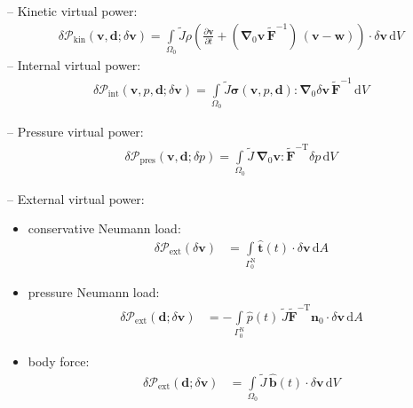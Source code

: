 \documentclass[a4paper,12pt]{report}
\newcommand{\bs}[1]{\boldsymbol{#1}}
\newcommand{\Om}{\mathit{\Omega}}
\newcommand{\Gm}{\mathit{\Gamma}}
\begin{document}
-- Kinetic virtual power:
\begin{equation}
\begin{aligned}
\delta \mathcal{P}_{\mathrm{kin}}(\bs{v},\bs{d};\delta\bs{v}) = \int\limits_{\Om_0} \widetilde{J} \rho\left(\frac{\partial\bs{v}}{\partial t} + (\bs{\nabla}_{0}\bs{v}\,\widetilde{\bs{F}}^{-1})\,(\bs{v}-\bs{w})\right) \cdot \delta\bs{v} \,\mathrm{d}V
\end{aligned}
\end{equation}
-- Internal virtual power:
\begin{equation}
\begin{aligned}
\delta \mathcal{P}_{\mathrm{int}}(\bs{v},p,\bs{d};\delta\bs{v}) = 
\int\limits_{\Om_0} \widetilde{J}\bs{\sigma}(\bs{v},p,\bs{d}) : \bs{\nabla}_{0} \delta\bs{v}\,\widetilde{\bs{F}}^{-1} \,\mathrm{d}V
\end{aligned}
\end{equation}

-- Pressure virtual power:
\begin{equation}
\begin{aligned}
\delta \mathcal{P}_{\mathrm{pres}}(\bs{v},\bs{d};\delta p) = 
\int\limits_{\Om_0} \widetilde{J}\,\bs{\nabla}_{0}\bs{v} : \widetilde{\bs{F}}^{-\mathrm{T}}\delta p\,\mathrm{d}V
\end{aligned}
\end{equation}

-- External virtual power:\\
\begin{itemize}
\item conservative Neumann load:
\begin{equation}
\begin{aligned}
\delta \mathcal{P}_{\mathrm{ext}}(\delta\bs{v}) &= \int\limits_{\Gm_0^{\mathrm{N}}} \hat{\bs{t}}(t) \cdot \delta\bs{v} \,\mathrm{d}A
\end{aligned}
\end{equation}
\item pressure Neumann load:
\begin{equation}
\begin{aligned}
\delta \mathcal{P}_{\mathrm{ext}}(\bs{d};\delta\bs{v}) &= -\int\limits_{\Gm_0^{\mathrm{N}}} \hat{p}(t)\,\widetilde{J}\widetilde{\bs{F}}^{-\mathrm{T}}\bs{n}_{0} \cdot \delta\bs{v} \,\mathrm{d}A 
\end{aligned}
\end{equation}
\item body force:
\begin{equation}
\begin{aligned}
\delta \mathcal{P}_{\mathrm{ext}}(\bs{d};\delta\bs{v}) &= \int\limits_{\Om_0} \widetilde{J}\,\hat{\bs{b}}(t) \cdot \delta\bs{v} \,\mathrm{d}V
\end{aligned}
\end{equation}
\end{itemize}
\end{document}
